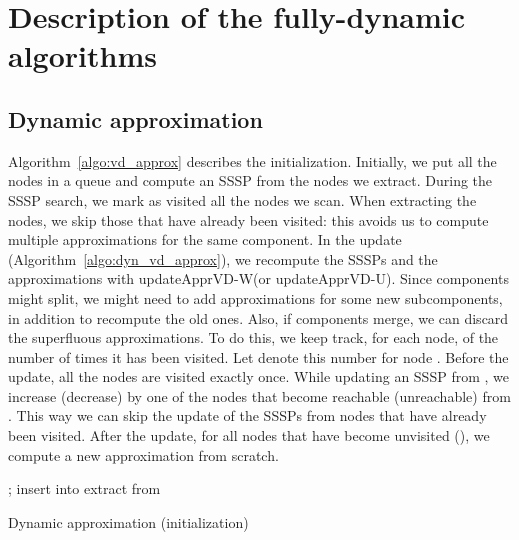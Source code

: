 \documentclass[english]{llncs}
\newcommand{\vd}{\xspace}
\newcommand{\vda}{\xspace}
\newcommand{\upvd}{\textsf{updateApprVD-W}\xspace}
\newcommand{\upvdu}{\textsf{updateApprVD-U}\xspace}
\begin{document}
\pagebreak
\appendix

\section{Description of the fully-dynamic algorithms}
\label{sec:pseudocodes}

\renewcommand{\floatpagefraction}{0.99}
\subsection{Dynamic \vd approximation}
Algorithm~\ref{algo:vd_approx} describes the initialization. Initially, we put all the nodes in a queue and compute an SSSP from the nodes we extract. During the SSSP search, we mark as visited all the nodes we scan. When extracting the nodes, we skip those that have already been visited: this avoids us to compute multiple approximations for the same component. 
In the update (Algorithm~\ref{algo:dyn_vd_approx}), we recompute the SSSPs and the \vd approximations with \upvd (or \upvdu). Since components might split, we might need to add \vd approximations for some new subcomponents, in addition to recompute the old ones. Also, if components merge, we can discard the superfluous approximations. To do this, we keep track, for each node, of the number of times it has been visited. Let  denote this number for node . Before the update, all the nodes are visited exactly once. While updating an SSSP from , we increase (decrease) by one  of the nodes  that become reachable (unreachable) from . This way we can skip the update of the SSSPs from nodes that have already been visited. After the update, for all nodes  that have become unvisited (), we compute a new \vd approximation from scratch.

\begin{algorithm}[h]
 \begin{footnotesize}
\LinesNumbered
{}
\;
{
		; insert  into \; \label{initvd:queue}
}
\;
\While{}
{\label{initvd:newsamples1}
	extract  from \;
	\If{}
	{
		 \;
		  \initDynamicSSSP{}\;
		\;
	}
}\label{initvd:newsamples2}
\;
\vda \;
\Return{\vda}
\end{footnotesize}
\caption{Dynamic \vd approximation (initialization)}
\label{algo:vd_approx}
\end{algorithm}
\end{document}
